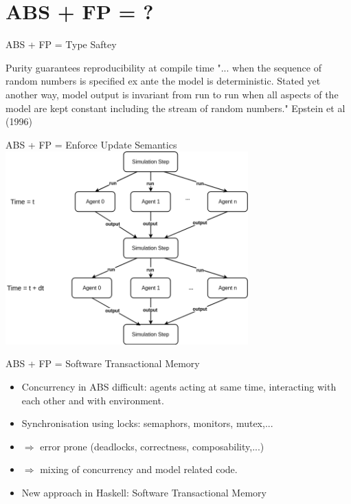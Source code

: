 \documentclass{beamer} %
\begin{document}
\section{ABS + FP = ?}
\begin{frame}{ABS + FP = Type Saftey}
	\begin{block}{Purity guarantees reproducibility at compile time}
    "... when the sequence of random numbers is specified ex ante the model is deterministic. Stated yet another way, model output is invariant from run to run when all aspects of the model are kept constant including the stream of random numbers." Epstein et al (1996)
    \end{block}
\end{frame}

\begin{frame}{ABS + FP = Enforce Update Semantics}
  \includegraphics[width=0.7\textwidth]{./fig/parallel_strategy.png}
\end{frame}

\begin{frame}{ABS + FP = Software Transactional Memory}
  \begin{itemize}
  	\item Concurrency in ABS difficult: agents acting at same time, interacting with each other and with environment.
	\item Synchronisation using locks: semaphors, monitors, mutex,...  	
  	\item $\Rightarrow$ error prone (deadlocks, correctness, composability,...)
  	\item $\Rightarrow$ mixing of concurrency and model related code.
  	\item New approach in Haskell: Software Transactional Memory
  \end{itemize}
\end{frame}
\end{document}
